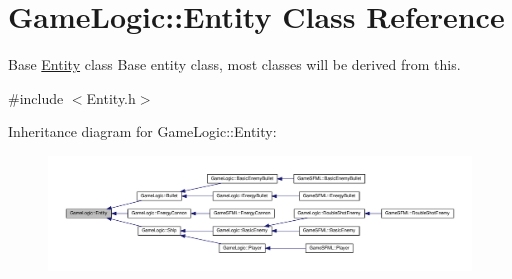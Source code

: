 \hypertarget{classGameLogic_1_1Entity}{}\section{Game\+Logic\+:\+:Entity Class Reference}
\label{classGameLogic_1_1Entity}


Base \hyperlink{classGameLogic_1_1Entity}{Entity} class Base entity class, most classes will be derived from this.  




{\ttfamily \#include $<$Entity.\+h$>$}



Inheritance diagram for Game\+Logic\+:\+:Entity\+:
\nopagebreak
\begin{figure}[H]
\begin{center}
\leavevmode
\includegraphics[width=350pt]{classGameLogic_1_1Entity__inherit__graph}
\end{center}
\end{figure}

